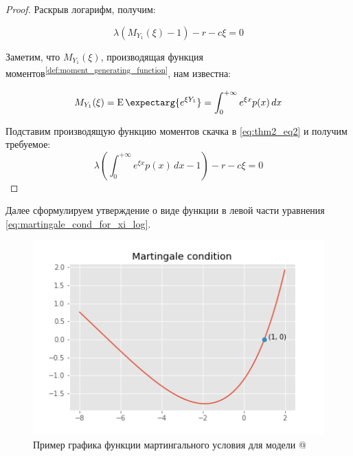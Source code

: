 \documentclass[a4paper,12pt]{article}
\makeatletter
\theoremstyle{definition}
\newcommand*{\rom}[1]{\expandafter\@slowromancap\romannumeral #1@}
\newcommand{\expect}{\operatorname{E}\expectarg}
\makeatother
\begin{document}
\begin{proof}
Раскрыв логарифм, получим:

\begin{equation}\label{eq:thm2_eq2}
\lambda \left(M_{Y_1}(\xi) - 1\right) - r - c\xi = 0
\end{equation}

Заметим, что $M_{Y_1}(\xi)$, производящая функция моментов\textsuperscript{{\ref{def:moment_generating_function}}}, нам известна:

\begin{equation*}
M_{Y_1}(\xi) = \expect{e^{\xi Y_1}} = \int_{0}^{+\infty} e^{\xi x} p(x) \,dx
\end{equation*}

Подставим производящую функцию моментов скачка в \eqref{eq:thm2_eq2} и получим требуемое:
\begin{equation*}
\lambda \left(\int_{0}^{+\infty} e^{\xi x} p(x) \,dx - 1\right) - r - c\xi = 0
\end{equation*}
\end{proof}

Далее сформулируем утверждение о виде функции в левой части уравнения \eqref{eq:martingale_cond_for_xi_log}.


\begin{figure}[htbp]
\label{fig:model1martingalecond}
\centerline{\includegraphics[scale=0.7]{img/model1_martingale_cond.png}}
\caption{Пример графика функции мартингального условия для модели \rom{1}}
\end{figure}
\end{document}
